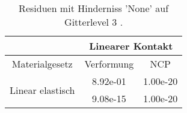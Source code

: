 \begin{table} 
\centering 
\begin{tabular}{c|cc|} 
\cline{2-3} 
 & \multicolumn{2}{|c|}{Linearer Kontakt} \\ 
\hline 
\multicolumn{1}{|c|}{Materialgesetz} & \multicolumn{1}{c|}{Verformung} & \multicolumn{1}{c|}{NCP} \\ 
\hline 
\multicolumn{1}{|c|}{\multirow{2}{*}{Linear elastisch}} &\multicolumn{1}{|c|}{  8.92e-01} & \multicolumn{1}{|c|}{  1.00e-20} \\ 
\multicolumn{1}{|c|}{} & \multicolumn{1}{|c|}{  9.08e-15} & \multicolumn{1}{|c|}{  1.00e-20} \\ 
\hline 
\end{tabular}\caption{Residuen mit Hinderniss 'None' auf Gitterlevel 3 .}\label{tab:Residuum_None_level3}
\end{table} 
